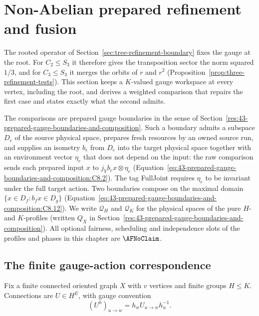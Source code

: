 \section{Non-Abelian prepared refinement and fusion}\label{res:44-nonabelian-prepared-refinement-and-fusion}
The rooted operator of Section~\ref{sec:tree-refinement-boundary} fixes the
gauge at the root.  For $C_2\le S_3$ it therefore gives the transposition
sector the norm squared $1/3$, and for $C_3\le S_3$ it merges the orbits of
$r$ and $r^2$ (Proposition~\ref{prop:three-refinement-tests}).  This section
keeps a $K$-valued gauge workspace at every vertex, including the root, and
derives a weighted comparison that repairs the first case and states exactly
what the second admits.

The comparisons are prepared gauge boundaries in the sense of
Section~\ref{res:43-prepared-gauge-boundaries-and-composition}.  Such a
boundary admits a subspace $D_e$ of the source physical space, prepares fresh
resources by an owned source run, and supplies an isometry $b_e$ from $D_e$
into the target physical space together with an environment vector $\eta_e$
that does not depend on the input: the raw comparison sends each prepared
input $x$ to $j_Yb_ex\otimes\eta_e$
(Equation~\eqref{eq:43-prepared-gauge-boundaries-and-composition:C8.2}).  The
tag FullJoint requires $\eta_e$ to be invariant under the full target action.
Two boundaries compose on the maximal domain $\{x\in D_f:b_fx\in D_g\}$
(Equation~\eqref{eq:43-prepared-gauge-boundaries-and-composition:C8.12}).  We
write $\mathcal Q_H$ and $\mathcal Q_K$ for the physical spaces of the pure $H$-
and $K$-profiles (written $Q_X$ in
Section~\ref{res:43-prepared-gauge-boundaries-and-composition}).  All optional
fairness, scheduling and independence slots of the profiles and phases in this
chapter are $\AFNoClaim$.

\subsection{The finite gauge-action correspondence}\label{md:44-nonabelian-prepared-refinement-and-fusion:the-finite-gauge-action-correspondence}

Fix a finite connected oriented graph $X$ with $v$ vertices and finite groups
$H\le K$.  Connections are $U\in H^E$, with gauge convention
\begin{equation}
(U^h)_{u\to w}=h_wU_{u\to w}h_u^{-1}.
 \label{eq:44-nonabelian-prepared-refinement-and-fusion:C9.1}
\end{equation}

